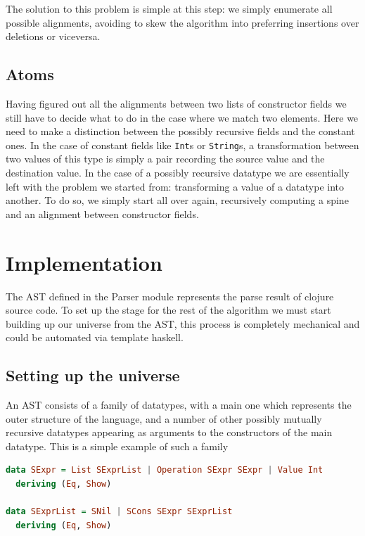 \documentclass[11pt]{article}
\begin{document}
The solution to this problem is simple at this step: we simply enumerate
all possible alignments, avoiding to skew the algorithm into preferring
insertions over deletions or viceversa.

\subsection{Atoms}\label{atoms}

Having figured out all the alignments between two lists of constructor
fields we still have to decide what to do in the case where we match two
elements. Here we need to make a distinction between the possibly
recursive fields and the constant ones. In the case of constant fields
like \texttt{Int}s or \texttt{String}s, a transformation between two
values of this type is simply a pair recording the source value and the
destination value. In the case of a possibly recursive datatype we are
essentially left with the problem we started from: transforming a value
of a datatype into another. To do so, we simply start all over again,
recursively computing a spine and an alignment between constructor
fields.

\section{Implementation}\label{implementation}

The AST defined in the Parser module represents the parse result of
clojure source code. To set up the stage for the rest of the algorithm
we must start building up our universe from the AST, this process is
completely mechanical and could be automated via template haskell.

\subsection{Setting up the universe}\label{setting-up-the-universe}

An AST consists of a family of datatypes, with a main one which
represents the outer structure of the language, and a number of other
possibly mutually recursive datatypes appearing as arguments to the
constructors of the main datatype. This is a simple example of such a
family

\begin{lstlisting}[language=haskell]
data SExpr = List SExprList | Operation SExpr SExpr | Value Int
  deriving (Eq, Show)

data SExprList = SNil | SCons SExpr SExprList
  deriving (Eq, Show)
\end{lstlisting}
\end{document}
